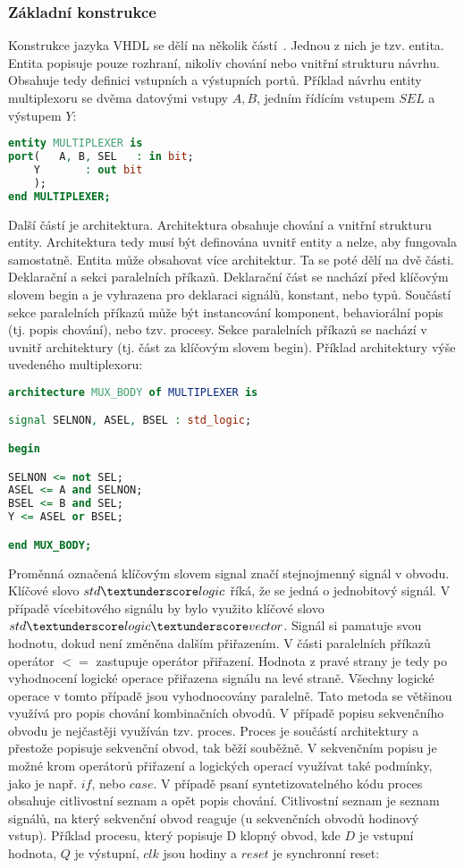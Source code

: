 \documentclass{report}
\begin{document}
\subsubsection{Základní konstrukce}
Konstrukce jazyka VHDL se dělí na několik částí~\cite{vhdlI}. Jednou z nich je tzv. entita. Entita popisuje pouze rozhraní, nikoliv chování nebo vnitřní strukturu návrhu. Obsahuje tedy definici vstupních a výstupních portů. Příklad návrhu entity multiplexoru se dvěma datovými vstupy $A, B$, jedním řídícím vstupem $SEL$ a výstupem $Y$:
\begin{lstlisting}[language=VHDL]
entity MULTIPLEXER is
port(   A, B, SEL 	: in bit;
	Y		: out bit
	);
end MULTIPLEXER;
\end{lstlisting}
Další částí je architektura. Architektura obsahuje chování a vnitřní strukturu entity. Architektura tedy musí být definována uvnitř entity a nelze, aby fungovala samostatně. Entita může obsahovat více architektur. Ta se poté dělí na dvě části. Deklarační a sekci paralelních příkazů. Deklarační část se nachází před klíčovým slovem begin a je vyhrazena pro deklaraci signálů, konstant, nebo typů. Součástí sekce paralelních příkazů může být instancování komponent, behaviorální popis (tj. popis chování), nebo tzv. procesy. Sekce paralelních příkazů se nachází v uvnitř architektury (tj. část za klíčovým slovem begin). Příklad architektury výše uvedeného multiplexoru:
\begin{lstlisting}[language=VHDL]
architecture MUX_BODY of MULTIPLEXER is

signal SELNON, ASEL, BSEL : std_logic;

begin

SELNON <= not SEL;
ASEL <= A and SELNON;
BSEL <= B and SEL;
Y <= ASEL or BSEL;

end MUX_BODY;
\end{lstlisting}
Proměnná označená klíčovým slovem signal značí stejnojmenný signál v obvodu. Klíčové slovo $std\textunderscore logic$ říká, že se jedná o jednobitový signál. V případě vícebitového signálu by bylo využito klíčové slovo $std\textunderscore logic\textunderscore vector$. Signál si pamatuje svou hodnotu, dokud není změněna dalším přiřazením. V části paralelních příkazů operátor $<=$ zastupuje operátor přiřazení. Hodnota z pravé strany je tedy po vyhodnocení logické operace přiřazena signálu na levé straně. Všechny logické operace v tomto případě jsou vyhodnocovány paralelně. Tato metoda se většinou využívá pro popis chování kombinačních obvodů. V případě popisu sekvenčního obvodu je nejčastěji využíván tzv. proces. Proces je součástí architektury a přestože popisuje sekvenční obvod, tak běží souběžně. V sekvenčním popisu je možné krom operátorů přiřazení a logických operací využívat také podmínky, jako je např. $if$, nebo $case$. V případě psaní syntetizovatelného kódu proces obsahuje citlivostní seznam a opět popis chování. Citlivostní seznam je seznam signálů, na který sekvenční obvod reaguje (u sekvenčních obvodů hodinový vstup). Příklad procesu, který popisuje D klopný obvod, kde $D$ je vstupní hodnota, $Q$ je výstupní, $clk$ jsou hodiny a $reset$ je synchronní reset:
\end{document}
